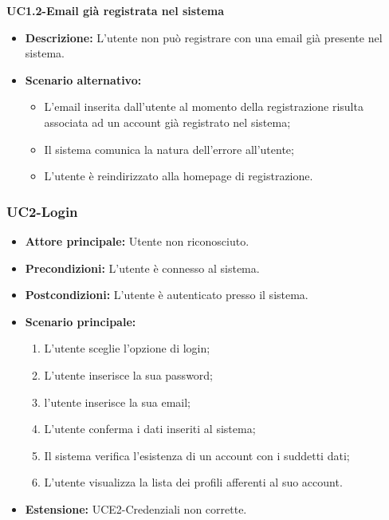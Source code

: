 \textbf{UC1.2-Email già registrata nel sistema}
\begin{itemize}
    \item \textbf{Descrizione: }L'utente non può registrare con una email già presente nel sistema.
    \item \textbf{Scenario alternativo:}
    \begin{itemize}
        \item L'email inserita dall'utente al momento della registrazione risulta associata ad un
        account già registrato nel sistema;
        \item Il sistema comunica la natura dell'errore all'utente;
        \item L'utente è reindirizzato alla homepage di registrazione.
    \end{itemize}
\end{itemize}
\break

\subsubsection{UC2-Login}
\begin{itemize}
\item \textbf{Attore principale:} Utente non riconosciuto.
\item \textbf{Precondizioni:} L'utente è connesso al sistema.
\item \textbf{Postcondizioni:} L'utente è autenticato presso il sistema.
\item \textbf{Scenario principale:}
\begin{enumerate}
    \item L'utente sceglie l'opzione di login;
    \item L'utente inserisce la sua password;
    \item l'utente inserisce la sua email;
    \item L'utente conferma i dati inseriti al sistema;
    \item Il sistema verifica l'esistenza di un account con i suddetti dati;
    \item L'utente visualizza la lista dei profili afferenti al suo account.
\end{enumerate}
    \item \textbf{Estensione: }UCE2-Credenziali non corrette.
\end{itemize}

